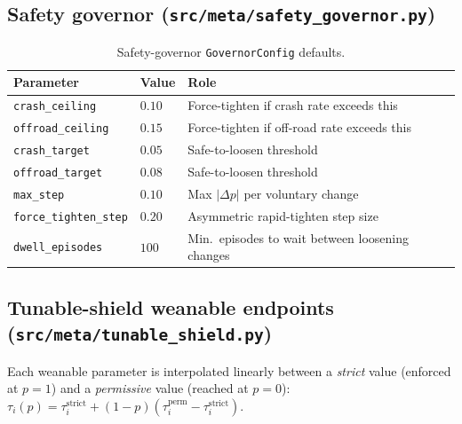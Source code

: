 \subsection*{Safety governor (\texttt{src/meta/safety\_governor.py})}

\begin{table}[H]
  \centering
  \caption{Safety-governor \texttt{GovernorConfig} defaults.}
  \label{tab:hp-governor}
  \small
  \begin{tabular}{@{}llp{5.8cm}@{}}
    \toprule
    \textbf{Parameter} & \textbf{Value} & \textbf{Role} \\
    \midrule
    \texttt{crash\_ceiling}       & \(0.10\) & Force-tighten if crash rate exceeds this \\
    \texttt{offroad\_ceiling}     & \(0.15\) & Force-tighten if off-road rate exceeds this \\
    \texttt{crash\_target}        & \(0.05\) & Safe-to-loosen threshold \\
    \texttt{offroad\_target}      & \(0.08\) & Safe-to-loosen threshold \\
    \texttt{max\_step}            & \(0.10\) & Max \(|\Delta p|\) per voluntary change \\
    \texttt{force\_tighten\_step} & \(0.20\) & Asymmetric rapid-tighten step size \\
    \texttt{dwell\_episodes}      & \(100\)  & Min.\ episodes to wait between loosening changes \\
    \bottomrule
  \end{tabular}
\end{table}

\subsection*{Tunable-shield weanable endpoints (\texttt{src/meta/tunable\_shield.py})}

Each weanable parameter is interpolated linearly between a \emph{strict} value
(enforced at \(p=1\)) and a \emph{permissive} value (reached at \(p=0\)):
\(\tau_i(p) = \tau_i^{\mathrm{strict}} + (1-p)(\tau_i^{\mathrm{perm}} - \tau_i^{\mathrm{strict}})\).

